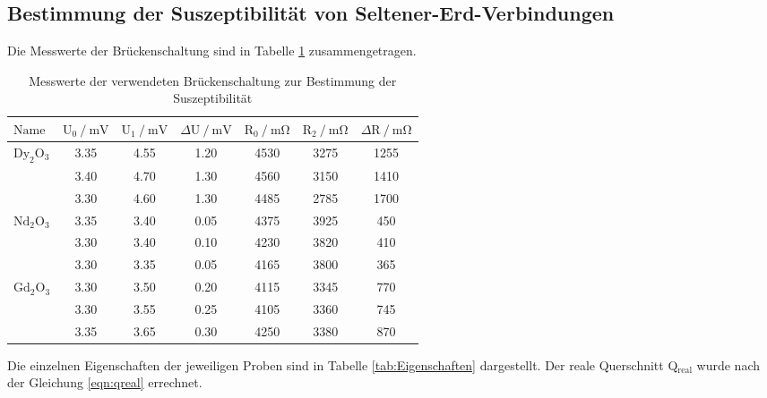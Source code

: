 \subsection{Bestimmung der Suszeptibilität von Seltener-Erd-Verbindungen}

Die Messwerte der Brückenschaltung sind in Tabelle \ref{tab:Brückenmessung} zusammengetragen.

\begin{table}
  \centering
  \caption{Messwerte der verwendeten Brückenschaltung zur Bestimmung der Suszeptibilität}
  \label{tab:Brückenmessung}
  \begin{tabular}{l c c c c c c}
    \toprule
    {$\text{Name}$} & {$\text{U}_0 \:/\: \si{\milli\volt}$} & {$\text{U}_1 \:/\: \si{\milli\volt}$} & {$\Delta \text{U} \:/\: \si{\milli\volt}$}  & {$\text{R}_0 \:/\: \si{\milli\ohm}$} & {$\text{R}_2 \:/\: \si{\milli\ohm}$} & {$\Delta \text{R} \:/\: \si{\milli\ohm}$} \\
     \midrule
     $\text{Dy}_2 \text{O}_3$ & 3.35 & 4.55 & 1.20 & 4530 & 3275 & 1255 \\
                            & 3.40 & 4.70 & 1.30 & 4560 & 3150 & 1410 \\
                            & 3.30 & 4.60 & 1.30 & 4485 & 2785 & 1700 \\
                            \hline
     $\text{Nd}_2 \text{O}_3$ & 3.35 & 3.40 & 0.05 & 4375 & 3925 & 450  \\
                            & 3.30 & 3.40 & 0.10 & 4230 & 3820 & 410  \\
                            & 3.30 & 3.35 & 0.05 & 4165 & 3800 & 365  \\
                            \hline
     $\text{Gd}_2 \text{O}_3$ & 3.30 & 3.50 & 0.20 & 4115 & 3345 & 770  \\
                            & 3.30 & 3.55 & 0.25 & 4105 & 3360 & 745  \\
                            & 3.35 & 3.65 & 0.30 & 4250 & 3380 & 870  \\
     \bottomrule
  \end{tabular}
\end{table}

Die einzelnen Eigenschaften der jeweiligen Proben sind in Tabelle \ref{tab:Eigenschaften} dargestellt.
Der reale Querschnitt Q$_\text{real}$ wurde nach der Gleichung \eqref{eqn:qreal} errechnet.

